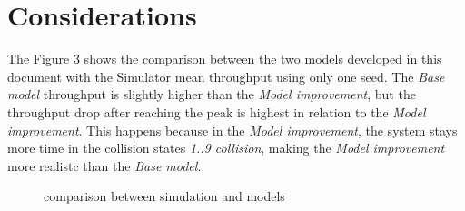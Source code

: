 \documentclass[conference]{IEEEtran}
\begin{document}
\section{Considerations}

The Figure 3 shows the comparison between the two models developed in this document with the Simulator mean throughput using only one seed. The \textit{Base model} throughput is slightly higher than the \textit{Model improvement}, but the throughput drop after reaching the peak is highest in relation to the \textit{Model improvement}. This happens because in the \textit{Model improvement}, the system stays more time in the collision states \textit{1..9 collision}, making the \textit{Model improvement} more realistc than the \textit{Base model}. 
\bigskip

\begin{figure}[H]
	\centering	 
	\caption{comparison between simulation and models}%
\end{figure}
\end{document}

